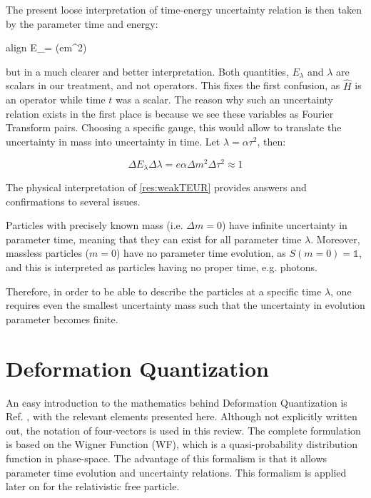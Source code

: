 \documentclass[twoside,a4paper,11pt]{article}
\numberwithin{equation}{section}
\newcommand{\boxedeq}[2]{\begin{empheq}[box={\fboxsep=6pt\fbox}]{align}\label{#1}#2\end{empheq}}
\begin{document}
The present loose interpretation of time-energy uncertainty relation is then taken by the parameter time and energy:
\boxedeq{res:weakTEUR}{
    \Delta E_\lambda \Delta \lambda = \Delta (em^2) \Delta \lambda \approx 1 
}
but in a much clearer and better interpretation. Both quantities, $E_\lambda$ and $\lambda$ are scalars in our treatment, and not operators. This fixes the first confusion, as $\hat{H}$ is an operator while time $t$ was a scalar. The reason why such an uncertainty relation exists in the first place is because we see these variables as Fourier Transform pairs. Choosing a specific gauge, this would allow to translate the uncertainty in mass into uncertainty in time. Let $\lambda = \alpha \tau^2$, then:

\begin{equation}
\Delta E_\lambda \Delta \lambda = e \alpha \Delta m^2 \Delta \tau^2 \approx  1
\end{equation}


The physical interpretation of \ref{res:weakTEUR} provides answers and confirmations to several issues. 

Particles with precisely known  mass (i.e. $\Delta m = 0$) have infinite uncertainty in parameter time, meaning that they can exist for all parameter time $\lambda$. Moreover, massless particles ($m=0$) have no parameter time evolution, as $S(m=0) = \mathds{1}$, and this is interpreted as particles having no proper time, e.g. photons. 

Therefore, in order to be able to describe the particles at a specific time $\lambda$, one requires even the smallest uncertainty mass such that the uncertainty in evolution parameter becomes finite. 




\newpage
\iffalse
\section{Deformation Quantization}
An easy introduction to the mathematics behind Deformation Quantization is Ref. \cite{DefQuantPhys}, with the relevant elements presented here. Although not explicitly written out, the notation of four-vectors is used in this review. The complete formulation is based on the Wigner Function (WF), which is a quasi-probability distribution function in phase-space. The advantage of this formalism is that it allows parameter time evolution and uncertainty relations. This formalism is applied later on for the relativistic free particle.
\end{document}
